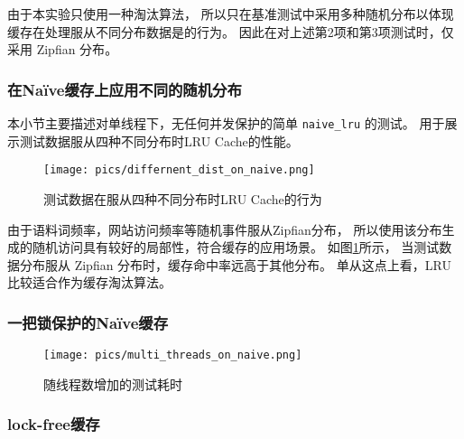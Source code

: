 由于本实验只使用一种淘汰算法，
所以只在基准测试中采用多种随机分布以体现缓存在处理服从不同分布数据是的行为。
因此在对上述第2项和第3项测试时，仅采用 Zipfian 分布\cite{dirtyzipf2024}。

\subsubsection{在Na\"{i}ve缓存上应用不同的随机分布}

本小节主要描述对单线程下，无任何并发保护的简单 \verb|naive_lru| 的测试。
用于展示测试数据服从四种不同分布时LRU Cache的性能。

\begin{figure}
    \centering
    \texttt{[image: pics/differnent\_dist\_on\_naive.png]}
    \caption{测试数据在服从四种不同分布时LRU Cache的行为}
    \label{fig:4-different-dists-lru-hit-ratio}
\end{figure}

由于语料词频率，网站访问频率等随机事件服从Zipfian分布，
所以使用该分布生成的随机访问具有较好的局部性，符合缓存的应用场景。
如图\ref{fig:4-different-dists-lru-hit-ratio}所示，
当测试数据分布服从 Zipfian 分布时，缓存命中率远高于其他分布。
单从这点上看，LRU比较适合作为缓存淘汰算法。

\subsubsection{一把锁保护的Na\"{i}ve缓存}

\begin{figure}
    \centering
    \texttt{[image: pics/multi\_threads\_on\_naive.png]}
    \caption{随线程数增加的测试耗时}
    \label{fig:multi-thread-naive}
\end{figure}

\subsubsection{lock-free缓存}


